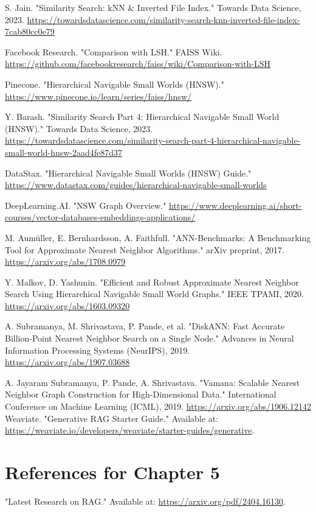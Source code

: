 \documentclass[12pt,a4paper,twoside,openright,justified]{book}
\begin{document}
\begin{thebibliography}{99}
S. Jain. "Similarity Search: kNN & Inverted File Index." Towards Data Science, 2023. \url{https://towardsdatascience.com/similarity-search-knn-inverted-file-index-7cab80cc0e79}

Facebook Research. "Comparison with LSH." FAISS Wiki. \url{https://github.com/facebookresearch/faiss/wiki/Comparison-with-LSH}

Pinecone. "Hierarchical Navigable Small Worlds (HNSW)." \url{https://www.pinecone.io/learn/series/faiss/hnsw/}

Y. Barash. "Similarity Search Part 4: Hierarchical Navigable Small World (HNSW)." Towards Data Science, 2023. \url{https://towardsdatascience.com/similarity-search-part-4-hierarchical-navigable-small-world-hnsw-2aad4fe87d37}

DataStax. "Hierarchical Navigable Small Worlds (HNSW) Guide." \url{https://www.datastax.com/guides/hierarchical-navigable-small-worlds}

DeepLearning.AI. "NSW Graph Overview." \url{https://www.deeplearning.ai/short-courses/vector-databases-embeddings-applications/}

M. Aumüller, E. Bernhardsson, A. Faithfull. "ANN-Benchmarks: A Benchmarking Tool for Approximate Nearest Neighbor Algorithms." arXiv preprint, 2017. \url{https://arxiv.org/abs/1708.0979}

Y. Malkov, D. Yashunin. "Efficient and Robust Approximate Nearest Neighbor Search Using Hierarchical Navigable Small World Graphs." IEEE TPAMI, 2020. \url{https://arxiv.org/abs/1603.09320}

A. Subramanya, M. Shrivastava, P. Pande, et al. "DiskANN: Fast Accurate Billion-Point Nearest Neighbor Search on a Single Node." Advances in Neural Information Processing Systems (NeurIPS), 2019. \url{https://arxiv.org/abs/1907.03688}

A. Jayaram Subramanya, P. Pande, A. Shrivastava. "Vamana: Scalable Nearest Neighbor Graph Construction for High-Dimensional Data." International Conference on Machine Learning (ICML), 2019. \url{https://arxiv.org/abs/1906.12142}
Weaviate. "Generative RAG Starter Guide." 
Available at: \url{https://weaviate.io/developers/weaviate/starter-guides/generative}.
\clearpage
\section*{References for Chapter 5}
"Latest Research on RAG." 
Available at: \url{https://arxiv.org/pdf/2404.16130}.


\end{thebibliography}
\end{document}

